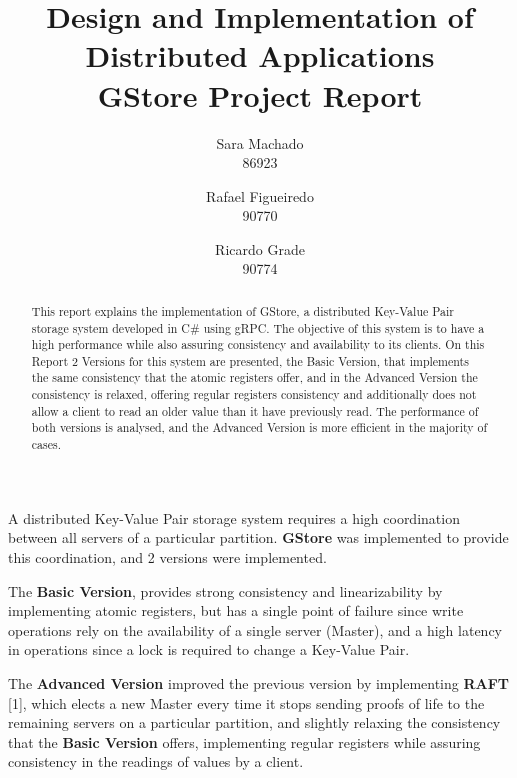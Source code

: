 \documentclass[times, 10pt,twocolumn]{article}
\begin{document}
\title{ Design and Implementation of Distributed Applications \\ GStore Project Report}

\author{ 
	Sara Machado \\ 86923
	\and
	Rafael Figueiredo \\ 90770
	\and
	Ricardo Grade \\ 90774
}

\maketitle
\thispagestyle{empty}

\begin{abstract}
	This report explains the implementation of GStore, a distributed Key-Value Pair storage system developed in C\# using gRPC. The objective of this system is to have a high performance while also assuring consistency and availability to its clients. On this Report 2 Versions for this system are presented, the Basic Version, that implements the same consistency that the atomic registers offer, and in the Advanced Version the consistency is relaxed, offering regular registers consistency and additionally does not allow a client to read an older value than it have previously read.
	The performance of both versions is analysed, and the Advanced Version is more efficient in the majority of cases.
\end{abstract}
A distributed Key-Value Pair storage system requires a high coordination between all servers of a particular partition. \textbf{GStore} was implemented to provide this coordination, and 2 versions were implemented.

The \textbf{Basic Version}, provides strong consistency and linearizability by implementing atomic registers, but has a single point of failure since write operations rely on the availability of a single server (Master), and a high latency in operations since a lock is required to change a Key-Value Pair. 

The \textbf{Advanced Version} improved the previous version by implementing \textbf{RAFT}  [1], which elects a new Master every time it stops sending proofs of life to the remaining servers on a particular partition, and slightly relaxing the consistency that the \textbf{Basic Version} offers, implementing regular registers while assuring consistency in the readings of values by a client.
\end{document}
